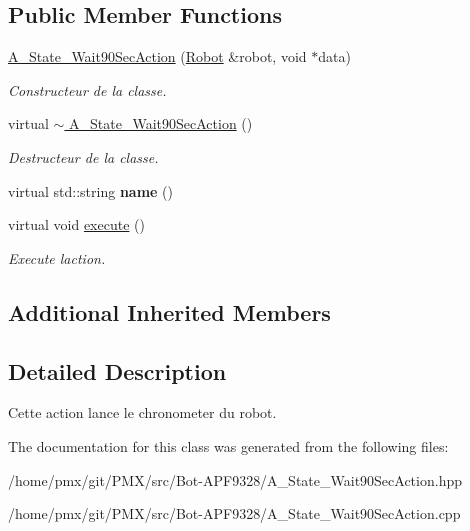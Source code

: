 \subsection*{Public Member Functions}
\begin{DoxyCompactItemize}
\item 
\mbox{\label{classA__State__Wait90SecAction_ae66516d475bb16f8fdcf17599705ff79}} 
\hyperlink{classA__State__Wait90SecAction_ae66516d475bb16f8fdcf17599705ff79}{A\+\_\+\+State\+\_\+\+Wait90\+Sec\+Action} (\hyperlink{classRobot}{Robot} \&robot, void $\ast$data)
\begin{DoxyCompactList}\small\item\em Constructeur de la classe. \end{DoxyCompactList}\item 
\mbox{\label{classA__State__Wait90SecAction_a217ea1674b38169449bada48c4a0422f}} 
virtual \hyperlink{classA__State__Wait90SecAction_a217ea1674b38169449bada48c4a0422f}{$\sim$ A\+\_\+\+State\+\_\+\+Wait90\+Sec\+Action} ()
\begin{DoxyCompactList}\small\item\em Destructeur de la classe. \end{DoxyCompactList}\item 
\mbox{\label{classA__State__Wait90SecAction_ab65d3e33397df2a82b873308a71dd29a}} 
virtual std\+::string {\bfseries name} ()
\item 
\mbox{\label{classA__State__Wait90SecAction_a97819ea5d7e7e034416368313ffda5c4}} 
virtual void \hyperlink{classA__State__Wait90SecAction_a97819ea5d7e7e034416368313ffda5c4}{execute} ()
\begin{DoxyCompactList}\small\item\em Execute l\textquotesingle{}action. \end{DoxyCompactList}\end{DoxyCompactItemize}
\subsection*{Additional Inherited Members}


\subsection{Detailed Description}
Cette action lance le chronometer du robot. 

The documentation for this class was generated from the following files\+:\begin{DoxyCompactItemize}
\item 
/home/pmx/git/\+P\+M\+X/src/\+Bot-\/\+A\+P\+F9328/A\+\_\+\+State\+\_\+\+Wait90\+Sec\+Action.\+hpp\item 
/home/pmx/git/\+P\+M\+X/src/\+Bot-\/\+A\+P\+F9328/A\+\_\+\+State\+\_\+\+Wait90\+Sec\+Action.\+cpp\end{DoxyCompactItemize}
